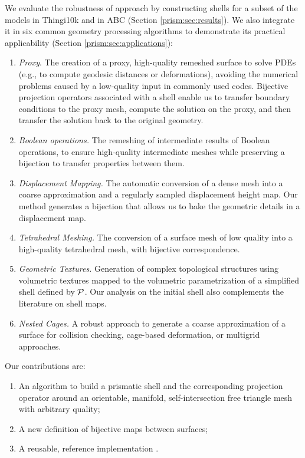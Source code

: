 We evaluate the robustness of approach by constructing shells for a subset of the models in Thingi10k \cite{zhou2016thingi10k} and in ABC \cite{koch2019abc} (Section \ref{prism:sec:results}). We also integrate it in six common geometry processing algorithms to demonstrate its practical applicability (Section \ref{prism:sec:applications}):
\begin{enumerate}
    \item \emph{Proxy}.
    The creation of a proxy, high-quality remeshed surface to solve PDEs (e.g., to compute geodesic distances or deformations), avoiding the numerical problems caused by a low-quality input in commonly used codes.
    Bijective projection operators associated with a shell enable us to transfer boundary conditions to the proxy mesh, compute the solution on the proxy, and then transfer the solution back to the original geometry.
    \item \emph{Boolean operations.} The remeshing of intermediate results of Boolean operations, to ensure high-quality intermediate meshes while preserving a bijection to transfer properties between them.
    \item \emph{Displacement Mapping.} The automatic conversion of a dense mesh into a coarse approximation and a regularly sampled displacement height map. Our method generates a  bijection that allows us to bake the geometric details in a displacement map.
    \item \emph{Tetrahedral Meshing.} The conversion of a surface mesh of low quality into a high-quality tetrahedral mesh, with bijective correspondence.
    \item \emph{Geometric Textures.} Generation of complex topological structures using volumetric textures mapped to the volumetric parametrization of a simplified shell defined by $\P$. Our analysis on the initial shell also complements the literature on shell maps.
    \item \emph{Nested Cages.} A robust approach to generate a coarse approximation of a surface for collision checking, cage-based deformation, or multigrid approaches.
\end{enumerate}

Our contributions are:
\begin{enumerate}
    \item An algorithm to build a prismatic shell and the corresponding projection operator around an orientable, manifold, self-intersection free triangle mesh with arbitrary quality;
    \item A new definition of bijective maps between  surfaces;%
    \item A reusable, reference implementation .
\end{enumerate}
